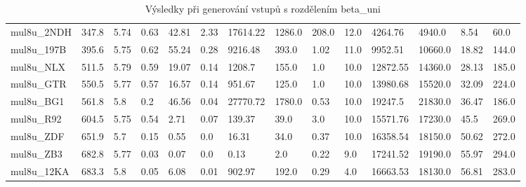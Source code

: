 \begin{landscape}
\begin{table}[!ht]
{\begin{tabular}{|l|l|l|l|l|l|l|l|l|l|l|l|l|l|}
        mul8u\_2NDH & 347.8 & 5.74 & 0.63 & 42.81 & 2.33 & 17614.22 & 1286.0 & 208.0 & 12.0 & 4264.76 & 4940.0 & 8.54 & 60.0 \\ 
        mul8u\_197B & 395.6 & 5.75 & 0.62 & 55.24 & 0.28 & 9216.48 & 393.0 & 1.02 & 11.0 & 9952.51 & 10660.0 & 18.82 & 144.0 \\ 
        mul8u\_NLX & 511.5 & 5.79 & 0.59 & 19.07 & 0.14 & 1208.7 & 155.0 & 1.0 & 10.0 & 12872.55 & 14360.0 & 28.13 & 185.0 \\ 
        mul8u\_GTR & 550.5 & 5.77 & 0.57 & 16.57 & 0.14 & 951.67 & 125.0 & 1.0 & 10.0 & 13980.68 & 15520.0 & 32.09 & 224.0 \\ 
        mul8u\_BG1 & 561.8 & 5.8 & 0.2 & 46.56 & 0.04 & 27770.72 & 1780.0 & 0.53 & 10.0 & 19247.5 & 21830.0 & 36.47 & 186.0 \\ 
        mul8u\_R92 & 604.5 & 5.75 & 0.54 & 2.71 & 0.07 & 139.37 & 39.0 & 3.0 & 10.0 & 15571.76 & 17230.0 & 45.5 & 269.0 \\ 
        mul8u\_ZDF & 651.9 & 5.7 & 0.15 & 0.55 & 0.0 & 16.31 & 34.0 & 0.37 & 10.0 & 16358.54 & 18150.0 & 50.62 & 272.0 \\ 
        mul8u\_ZB3 & 682.8 & 5.77 & 0.03 & 0.07 & 0.0 & 0.13 & 2.0 & 0.22 & 9.0 & 17241.52 & 19190.0 & 55.97 & 294.0 \\ 
        mul8u\_12KA & 683.3 & 5.8 & 0.05 & 6.08 & 0.01 & 902.97 & 192.0 & 0.29 & 4.0 & 16663.53 & 18130.0 & 56.81 & 283.0 \\ 
    \end{tabular}}
    \caption{Výsledky při generování vstupů s rozdělením beta\_uni}
    \label{beta_uni}
\end{table}


\end{landscape}

